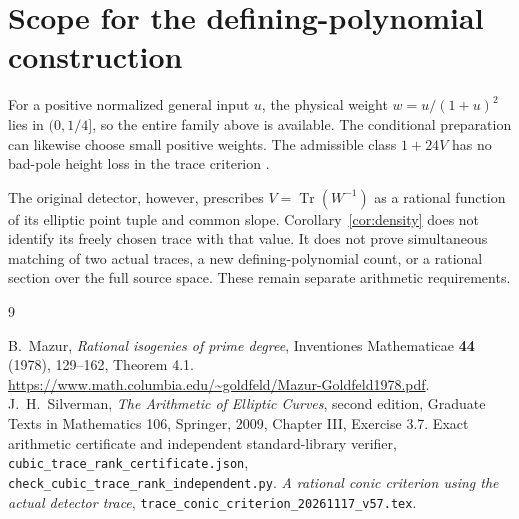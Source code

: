 \documentclass[11pt,a4paper]{article}
\DeclareMathOperator{\Tr}{Tr}
\begin{document}
\section{Scope for the defining-polynomial construction}

For a positive normalized general input \(u\), the physical weight
\(w=u/(1+u)^2\) lies in \((0,1/4]\), so the entire family above
is available. The conditional preparation can likewise choose small
positive weights. The admissible class \(1+24V\) has no bad-pole
height loss in the trace criterion \cite{Trace}.

The original detector, however, prescribes
\(V=\Tr(W^{-1})\) as a rational function of its elliptic point tuple
and common slope. Corollary~\ref{cor:density} does not identify its
freely chosen trace with that value. It does not prove simultaneous
matching of two actual traces, a new defining-polynomial count, or a
rational section over the full source space. These remain separate
arithmetic requirements.

\begin{thebibliography}{9}\raggedright
{}B.~Mazur, \emph{Rational isogenies of prime degree},
Inventiones Mathematicae \textbf{44} (1978), 129--162, Theorem 4.1.
\url{https://www.math.columbia.edu/~goldfeld/Mazur-Goldfeld1978.pdf}.
J.~H.~Silverman, \emph{The Arithmetic of Elliptic
Curves}, second edition, Graduate Texts in Mathematics 106, Springer,
2009, Chapter III, Exercise 3.7.
Exact arithmetic certificate and independent
standard-library verifier,
\nolinkurl{cubic_trace_rank_certificate.json},
\nolinkurl{check_cubic_trace_rank_independent.py}.
\emph{A rational conic criterion using the actual
detector trace},
\nolinkurl{trace_conic_criterion_20261117_v57.tex}.
\end{thebibliography}
\end{document}
